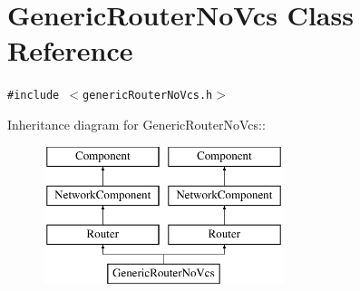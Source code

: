 \hypertarget{classGenericRouterNoVcs}{
\section{GenericRouterNoVcs Class Reference}
\label{classGenericRouterNoVcs}
}
{\tt \#include $<$genericRouterNoVcs.h$>$}

Inheritance diagram for GenericRouterNoVcs::\begin{figure}[H]
\begin{center}
\leavevmode
\includegraphics[height=4cm]{classGenericRouterNoVcs}
\end{center}
\end{figure}
